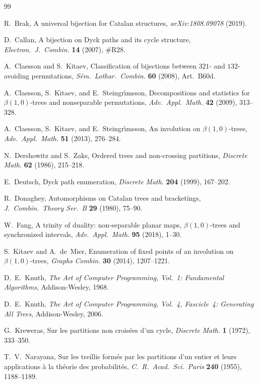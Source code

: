 \documentclass[a4paper,11pt]{article}
\theoremstyle{definition}
\begin{document}
\begin{thebibliography}{99}

R.~Brak,
A universal bijection for Catalan structures,
\emph{arXiv:1808.09078} (2019).

D.~Callan,
A bijection on Dyck paths and its cycle structure,
\emph{Electron.\ J.\ Combin.} \textbf{14} (2007),
\#R28.

A.~Claesson and S.~Kitaev,
Classification of bijections between $321$- and
$132$-avoiding permutations,
\emph{S\'{e}m.\ Lothar.\ Combin.} \textbf{60} (2008),
Art.~B60d.

A.~Claesson, S.~Kitaev,
and E.~Steingr\'{\i}msson,
Decompositions and statistics for
$\beta(1,0)$-trees and nonseparable permutations,
\emph{Adv.\ Appl.\ Math.} \textbf{42} (2009),
313--328.

A.~Claesson, S.~Kitaev,
and E.~Steingr\'{\i}msson,
An involution on $\beta(1,0)$-trees,
\emph{Adv.\ Appl.\ Math.} \textbf{51} (2013),
276--284.

N.~Dershowitz and S.~Zaks,
Ordered trees and non-crossing partitions,
\emph{Discrete Math.} \textbf{62} (1986), 215--218.

E.~Deutsch,
Dyck path enumeration,
\emph{Discrete Math.} \textbf{204} (1999), 167--202.

R.~Donaghey,
Automorphisms on Catalan trees and bracketings,
\emph{J.\ Combin.\ Theory Ser.~B} \textbf{29} (1980),
75--90.

W.~Fang,
A trinity of duality: non-separable planar maps,
$\beta(1,0)$-trees and synchronized intervals,
\emph{Adv.\ Appl.\ Math.} \textbf{95} (2018), 1--30.

S.~Kitaev and A.~de~Mier,
Enumeration of fixed points of an involution on
$\beta(1,0)$-trees,
\emph{Graphs Combin.} \textbf{30} (2014), 1207--1221.

D.~E.~Knuth,
\emph{The Art of Computer Programming, Vol.~1:
Fundamental Algorithms},
Addison-Wesley, 1968.

D.~E.~Knuth,
\emph{The Art of Computer Programming, Vol.~4,
Fascicle~4: Generating All Trees},
Addison-Wesley, 2006.

G.~Kreweras,
Sur les partitions non crois\'{e}es d'un cycle,
\emph{Discrete Math.} \textbf{1} (1972), 333--350.

T.~V.~Narayana,
Sur les treillis form\'{e}s par les partitions d'un
entier et leurs applications \`{a} la th\'{e}orie des
probabilit\'{e}s,
\emph{C.\ R.\ Acad.\ Sci.\ Paris} \textbf{240}
(1955), 1188--1189.


\end{thebibliography}
\end{document}
